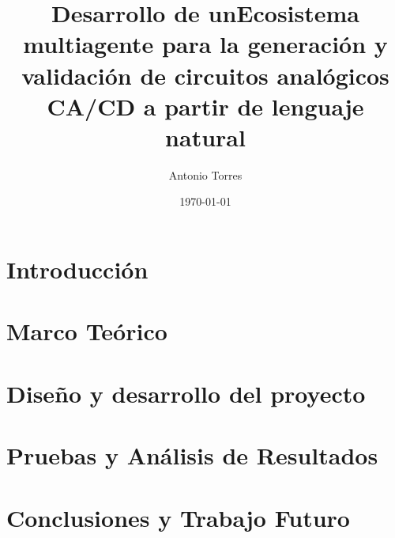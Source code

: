 \documentclass[12pt,letterpaper,oneside]{report}
\title{Desarrollo de unEcosistema multiagente para la generación y validación de circuitos analógicos CA/CD a partir de lenguaje natural}
\author{Antonio Torres}
\date{\today}
\renewcommand{\_}{\textunderscore\allowbreak}
\begin{document}

  
  \clearpage

%   
  \clearpage

  \renewcommand{\contentsname}{Índice}
  \tableofcontents
  \clearpage
  \listoffigures
  \clearpage


  \chapter*{Introducción}
  
  
  
  
  
  

  \chapter{Marco Teórico}
  

  \chapter{Diseño y desarrollo del proyecto}
  
  

  \chapter{Pruebas y Análisis de Resultados}
  

  \chapter{Conclusiones y Trabajo Futuro}
  

  \clearpage
  \printbibliography[heading=bibintoc,title={Referencias}]

  \appendix
  
\end{document}
